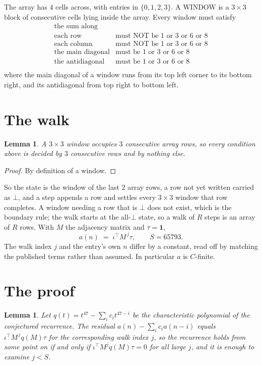 \documentclass[11pt,a4paper]{article}
\theoremstyle{plain}
\newtheorem{lemma}[theorem]{Lemma}
\theoremstyle{definition}
\begin{document}
The array has $4$ cells across, with entries in $\{0,1,2,3\}$. A WINDOW is a $3\times3$ block
of consecutive cells lying inside the array. Every window must satisfy
\[
\begin{array}{ll}
\text{the sum along} & \text{} \\[2pt]
\text{each row} & \text{must NOT be 1 or 3 or 6 or 8} \\
\text{each column} & \text{must NOT be 1 or 3 or 6 or 8} \\
\text{the main diagonal} & \text{must be 1 or 3 or 6 or 8} \\
\text{the antidiagonal} & \text{must be 1 or 3 or 6 or 8} \\
\end{array}
\]
where the main diagonal of a window runs from its top left corner to its bottom right, and its
antidiagonal from top right to bottom left.

\section{The walk}

\begin{lemma}\label{lem:win}
A $3\times3$ window occupies $3$ consecutive array rows, so every condition above is
decided by $3$ consecutive rows and by nothing else.
\end{lemma}

\begin{proof}
By definition of a window.
\end{proof}

So the state is the window of the last $2$ array rows, a row not yet written carried as
$\bot$, and a step appends a row and settles every $3\times3$ window that row completes. A
window needing a row that is $\bot$ does not exist, which is the boundary rule; the walk starts
at the all-$\bot$ state, so a walk of $R$ steps is an array of $R$ rows. With $M$ the adjacency
matrix and $\tau=\mathbf{1}$,
\[
a(n)\;=\;\iota^{\!\top}M^{\,j}\tau ,\qquad S=65793.
\]
The walk index $j$ and the entry's own $n$ differ by a constant, read off by matching the
published terms rather than assumed. In particular $a$ is $C$-finite.

\section{The proof}

\begin{lemma}\label{lem:crit}
Let $q(t)=t^{47}-\sum_i c_it^{47-i}$ be the characteristic polynomial of the
conjectured recurrence. The residual $a(n)-\sum_ic_ia(n-i)$ equals
$\iota^{\!\top}M^{\,j}q(M)\tau$ for the corresponding walk index $j$, so the recurrence
holds from some point on if and only if $\iota^{\!\top}M^{j}q(M)\tau=0$ for all large $j$,
and it is enough to examine $j<S$.
\end{lemma}
\end{document}
